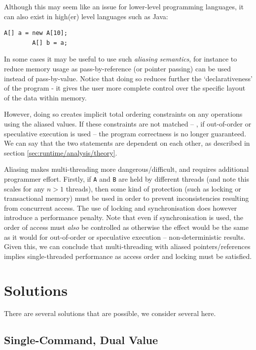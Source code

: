 	Although this may seem like an issue for lower-level programming languages, it can also exist in high(er) level languages such as Java:
	
	\begin{lstlisting}[caption=Aliasing in Java,caption=lst:javaalias]
		A[] a = new A[10];
		A[] b = a;\end{lstlisting}
	
	In some cases it may be useful to use such \textit{aliasing semantics}, for instance to reduce memory usage as pass-by-reference (or pointer passing) can be used instead of pass-by-value. Notice that doing so reduces further the `declarativeness' of the program - it gives the user more complete control over the specific layout of the data within memory.
	
	However, doing so creates implicit total ordering constraints on any operations using the aliased values. If these constraints are not matched -- \eg, if out-of-order or speculative execution is used -- the program correctness is no longer guaranteed. We can say that the two statements are dependent on each other, as described in section \ref{sec:runtime/analysis/theory}.
	
	Aliasing makes multi-threading more dangerous/difficult, and requires additional programmer effort. Firstly, if \texttt{A} and \texttt{B} are held by different threads (and note this scales for any $n > 1$ threads), then some kind of protection (such as locking or transactional memory) must be used in order to prevent inconsistencies resulting from concurrent access. The use of locking and synchronisation does however introduce a performance penalty. Note that even if synchronisation is used, the order of access must \emph{also} be controlled as otherwise the effect would be the same as it would for out-of-order or speculative execution -- non-deterministic results. Given this, we can conclude that multi-threading with aliased pointers/references implies single-threaded performance as access order and locking must be satisfied.

\section{Solutions} \label{sec:parametric/solutions}
There are several solutions that are possible, we consider several here.

	\subsection{Single-Command, Dual Value} \label{sec:parametric/solutions/scdv}

